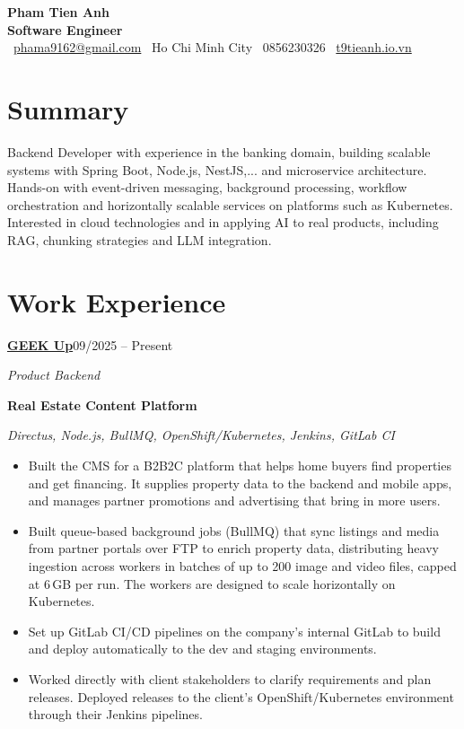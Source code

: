 \documentclass[11pt,a4paper]{article}
\newcommand{\entry}[3]{%
  \textbf{#1}\hfill #2\par\vspace{3pt}
  {\itshape\color{subtle}#3}\par\vspace{1pt}}
\newcommand{\company}[3]{\href{#2}{#1}\normalfont{\small\color{subtle}\quad\href{#2}{#3}}}
\newcommand{\project}[2]{\textbf{#1}\par{\small\itshape\color{subtle}#2}\par}
\begin{document}
\begin{center}
  {\fontsize{24}{28}\selectfont\textbf{Pham Tien Anh}}\\[6pt]
  {\large\textbf{Software Engineer}}\\[8pt]
  \faEnvelope\ \href{mailto:phama9162@gmail.com}{phama9162@gmail.com}\quad
  \faMapMarker*\ Ho Chi Minh City\quad
  \faPhone\ 0856230326\quad
  \faGlobe\ \href{https://www.t9tieanh.io.vn/}{t9tieanh.io.vn}
\end{center}

\section{Summary}
Backend Developer with experience in the banking domain, building scalable systems with Spring Boot, Node.js, NestJS,... and microservice architecture. Hands-on with event-driven messaging, background processing, workflow orchestration and horizontally scalable services on platforms such as Kubernetes. Interested in cloud technologies and in applying AI to real products, including RAG, chunking strategies and LLM integration.

\begingroup
{}
\section{Work Experience}
\entry{\company{GEEK Up}{https://geekup.vn/}{geekup.vn}}{09/2025 -- Present}{Product Backend}

\project{Real Estate Content Platform}{Directus, Node.js, BullMQ, OpenShift/Kubernetes, Jenkins, GitLab CI}
\begin{itemize}
  \item Built the CMS for a B2B2C platform that helps home buyers find properties and get financing. It supplies property data to the backend and mobile apps, and manages partner promotions and advertising that bring in more users.
  \item Built queue-based background jobs (BullMQ) that sync listings and media from partner portals over FTP to enrich property data, distributing heavy ingestion across workers in batches of up to 200 image and video files, capped at 6\,GB per run. The workers are designed to scale horizontally on Kubernetes.
  \item Set up GitLab CI/CD pipelines on the company's internal GitLab to build and deploy automatically to the dev and staging environments.
  \item Worked directly with client stakeholders to clarify requirements and plan releases. Deployed releases to the client's OpenShift/Kubernetes environment through their Jenkins pipelines.
\end{itemize}
\vspace{8pt}
\end{document}
